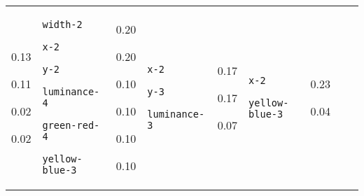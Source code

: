 {\begin{tabular}{@{}p{0.95cm}|p{1.9cm}@{}p{0.6cm}@{}|p{1.9cm}@{}p{0.6cm}@{}|p{1.9cm}@{}p{0.6cm}@{}|p{1.9cm}@{}p{0.5cm}@{}}
0.13

0.11

0.02

0.02 & \texttt{width-2}

\texttt{x-2}

\texttt{y-2}

\texttt{luminance-4}

\texttt{green-red-4}

\texttt{yellow-blue-3} & 0.20

0.20

0.10

0.10

0.10

0.10 & \texttt{x-2}

\texttt{y-3}

\texttt{luminance-3} & 0.17

0.17

0.07 & \texttt{x-2}

\texttt{yellow-blue-3} & 0.23

0.04
\end{tabular}}


